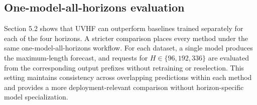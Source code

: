 \documentclass[final,3p,times]{elsarticle}
\begin{document}
\subsection{One-model-all-horizons evaluation}
\label{sec:one-model-comparison}


Section 5.2 shows that UVHF can outperform baselines trained separately for each of the four horizons. A stricter comparison places every method under the same one-model-all-horizons workflow. For each dataset, a single model produces the maximum-length forecast, and requests for $H\in\{96,192,336\}$ are evaluated from the corresponding output prefixes without retraining or reselection. This setting maintains consistency across overlapping predictions within each method and provides a more deployment-relevant comparison without horizon-specific model specialization.
\end{document}
